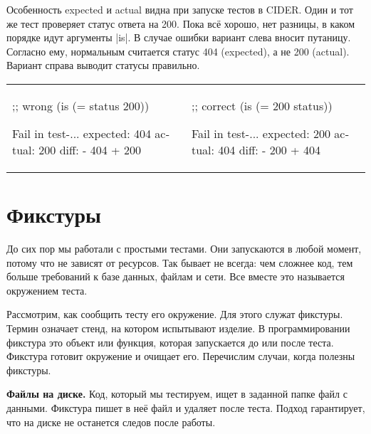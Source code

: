 
Особенность expected и actual видна при запуске тестов в CIDER. Один и тот же
тест проверяет статус ответа на 200. Пока всё хорошо, нет разницы, в каком
порядке идут аргументы \spverb|is|. В случае ошибки вариант слева вносит
путаницу. Согласно ему, нормальным считается статус 404 (expected), а не 200
(actual). Вариант справа выводит статусы правильно.

\noindent
\begin{tabular}{ @{}p{5cm} @{}p{5cm} }

\begin{english}
  \begin{clojure}
;; wrong
(is (= status 200))

Fail in test-...
expected: 404
  actual: 200
    diff: - 404
          + 200
  \end{clojure}
\end{english}

&

\begin{english}
  \begin{clojure}
;; correct
(is (= 200 status))

Fail in test-...
expected: 200
  actual: 404
    diff: - 200
          + 404
  \end{clojure}
\end{english}

\end{tabular}

\section{Фикстуры}


До сих пор мы работали с простыми тестами. Они запускаются в любой момент,
потому что не зависят от ресурсов. Так бывает не всегда: чем сложнее код, тем
больше требований к базе данных, файлам и сети. Все вместе это называется
окружением теста.

Рассмотрим, как сообщить тесту его окружение. Для этого служат фикстуры. Термин
означает стенд, на котором испытывают изделие. В программировании фикстура это
объект или функция, которая запускается до или после теста. Фикстура готовит
окружение и очищает его. Перечислим случаи, когда полезны фикстуры.


\textbf{Файлы на диске.} Код, который мы тестируем, ищет в заданной папке файл с
данными. Фикстура пишет в неё файл и удаляет после теста. Подход гарантирует,
что на диске не останется следов после работы.


